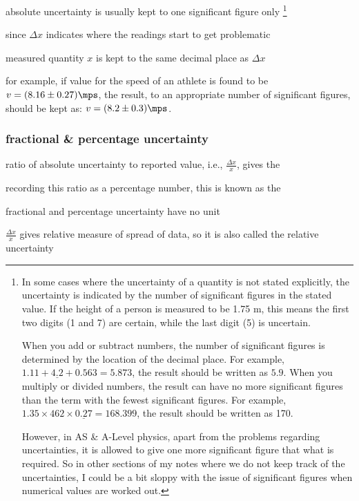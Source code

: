 \cmt absolute uncertainty is usually kept to one significant figure only
\footnote{In some cases where the uncertainty of a quantity is not stated explicitly, the uncertainty is indicated by the number of significant figures in the stated value. If the height of a person is measured to be 1.75 m, this means the first two digits (1 and 7) are certain, while the last digit (5) is uncertain.
	
	When you add or subtract numbers, the number of significant figures is determined by the location of the decimal place. For example, $1.11+\underline{4.2}+0.563=5.873$, the result should be written as $5.9$. When you multiply or divided numbers, the result can have no more significant figures than the term with the fewest significant figures. For example, $1.35\times462\times\underline{0.27} = 168.399$, the result should be written as 170.
	
	However, in AS \& A-Level physics, apart from the problems regarding uncertainties, it is allowed to give one more significant figure that what is required. So in other sections of my notes where we do not keep track of the uncertainties, I could be a bit sloppy with the issue of significant figures when numerical values are worked out.}

since $\Delta x$ indicates where the readings start to get problematic

measured quantity $x$ is kept to the same decimal place as $\Delta x$

for example, if value for the speed of an athlete is found to be $v=(8.16\pm0.27)\mps$, the result, to an appropriate number of significant figures, should be kept as: $v=(8.2\pm0.3) \mps$.



\subsubsection{fractional \& percentage uncertainty}

ratio of absolute uncertainty to reported value, i.e., $\frac{\Delta x}{x}$, gives the 

recording this ratio as a percentage number, this is known as the 

\cmt fractional and percentage uncertainty have no unit

\cmt $\frac{\Delta x}{x}$ gives relative measure of spread of data, so it is also called the relative uncertainty

